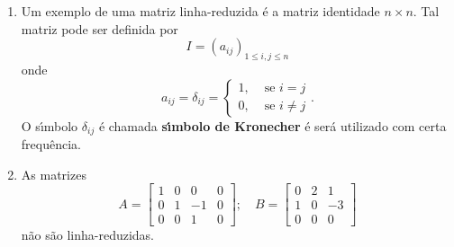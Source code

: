 \begin{exemplo}
\begin{enumerate}
	\item Um exemplo de uma matriz linha-reduzida \'e a matriz identidade $n \times n$. Tal matriz pode ser definida por
	\[
	I = (a_{ij})_{1 \le i,j \le n}
	\]
	onde
	\[
	a_{ij} = \delta_{ij} = \begin{cases}
	1, & \mbox{ se } i = j\\
	0, & \mbox{ se } i \ne j 
	\end{cases}.
	\]
	O s{\'\i}mbolo $\delta_{ij}$ \'e chamada \textbf{s{\'\i}mbolo de Kronecher} \'e ser\'a utilizado com certa frequ\^encia.
	\item As matrizes
	\[
	A = \begin{bmatrix}
	1 & 0 & 0 & 0\\
	0 & 1 & -1 & 0\\
	0 & 0 & 1 & 0
	\end{bmatrix}; \quad B = \begin{bmatrix}
	0 & 2 & 1\\
	1 & 0 & -3\\
	0 & 0 & 0
	\end{bmatrix}
	\]
	n\~ao s\~ao linha-reduzidas.
\end{enumerate}
\end{exemplo}

